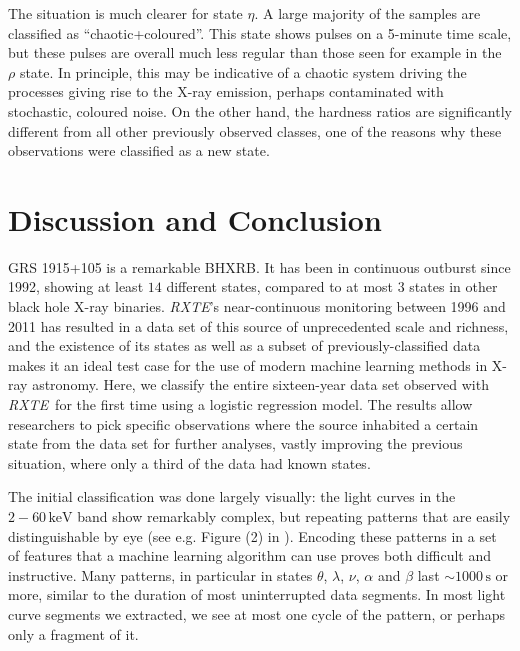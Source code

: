 \documentclass[fleqn,usenatbib]{mnras}
\newcommand{\project}[1]{\textsl{#1}}
\newcommand{\rxte}{\project{RXTE}}
\begin{document}
The situation is much clearer for state $\eta$. A large majority of the samples are classified as ``chaotic+coloured''. This state shows pulses on a 5-minute time scale, but these pulses are overall much less regular than those seen for example in the $\rho$ state. In principle, this may be indicative of a chaotic system driving the processes giving rise to the X-ray emission, perhaps contaminated with stochastic, coloured noise. On the other hand, the hardness ratios are significantly different from all other previously observed classes, one of the reasons why these observations were classified as a new state. 

\section{Discussion and Conclusion}
\label{sec:discussion}

GRS 1915+105 is a remarkable BHXRB. It has been in continuous outburst since 1992, showing at least $14$ different states, compared to at most 
$3$ states in other black hole X-ray binaries.
\rxte's near-continuous monitoring between 1996 and 2011 has resulted in a data set of this source of unprecedented scale and richness, and the existence of its states as well as a subset of previously-classified data makes it an ideal test case for the use of modern machine learning methods in X-ray astronomy.
Here, we classify the entire sixteen-year data set observed with \rxte\ for the first time using a logistic regression model. 
The results allow researchers to pick specific observations where the source inhabited a certain state from the data set for further analyses, vastly improving 
the previous situation, where only a third of the data had known states.

The initial classification was done largely visually: the light curves in the $2-60\,\mathrm{keV}$ band show remarkably complex, but repeating patterns that are 
easily distinguishable by eye (see e.g. Figure (2) in \citealt{belloni2000}). Encoding these patterns in a set of features that a machine learning algorithm can use proves both difficult and instructive.
Many patterns, in particular in states $\theta$, $\lambda$, $\nu$, $\alpha$ and $\beta$ last $\sim 1000\,\mathrm{s}$ or more, similar to the duration of most 
uninterrupted data segments. In most light curve segments we extracted, we see at most one cycle of the pattern, or perhaps only a fragment of it.
\end{document}
